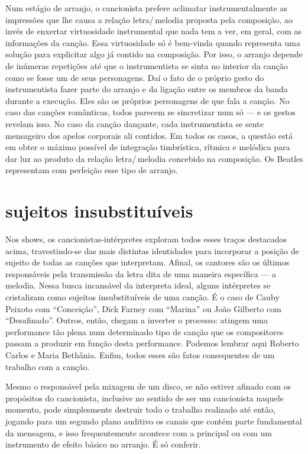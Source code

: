 Num estágio de arranjo, o cancionista prefere aclimatar
instrumentalmente as impressões que lhe causa a relação letra/\,melodia
proposta pela composição, ao invés de enxertar virtuosidade
instrumental que nada tem a ver, em geral, com as informações da canção.
Essa virtuosidade só é bem-vinda quando representa uma solução para
explicitar algo já contido na composição. Por isso, o arranjo depende de
inúmeras repetições até que o instrumentista se sinta no interior da
canção como se fosse um de seus personagens. Daí o fato de o próprio
gesto do instrumentista fazer parte do arranjo e da ligação entre os
membros da banda durante a execução. Eles são os próprios personagens de
que fala a canção. No caso das canções românticas, todos parecem se
sincretizar num só --- e os gestos revelam isso. No caso da canção
dançante, cada instrumentista se sente mensageiro dos apelos corporais
ali contidos. Em todos os casos, a questão está em obter o máximo
possível de integração timbrística, rítmica e melódica para dar luz ao
produto da relação letra/\,melodia concebido na composição. Os Beatles
representam com perfeição esse tipo de arranjo.

\section{sujeitos insubstituíveis}

Nos shows, os cancionistas-intérpretes exploram todos esses traços
destacados acima, travestindo-se das mais distintas identidades para
incorporar a posição de sujeito de todas as canções que interpretam.
Afinal, os cantores são os últimos responsáveis pela transmissão da
letra dita de uma maneira específica --- a melodia. Nessa
busca incansável da interpreta ideal, alguns intérpretes se cristalizam
como sujeitos insubstituíveis de uma canção. É o caso de Cauby Peixoto
com ``Conceição'', Dick Farney com ``Marina'' ou João Gilberto com
``Desafinado''. Outros, então, chegam a inverter o processo: atingem
uma performance tão plena num determinado tipo de canção que os compositores
passam a produzir em função desta performance. Podemos lembrar aqui
Roberto Carlos e Maria Bethânia. Enfim, todos esses são fatos
consequentes de um trabalho com a canção.

Mesmo o responsável pela mixagem de um disco, se não estiver afinado com
os propósitos do cancionista, inclusive no sentido de ser um cancionista
naquele momento, pode simplesmente destruir todo o trabalho realizado
até então, jogando para um segundo plano auditivo os canais que contém
parte fundamental da mensagem, e isso frequentemente acontece com a
principal ou com um instrumento de efeito básico no arranjo. É só
conferir.

